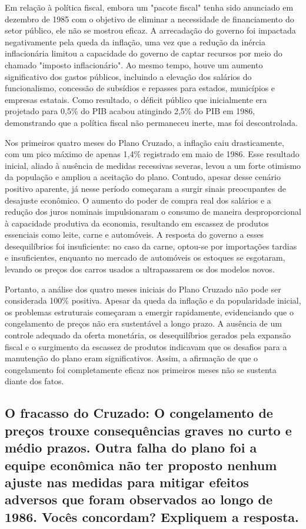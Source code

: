 \documentclass[a4paper,12pt]{article}[abntex2]
\begin{document}
Em relação à política fiscal, embora um "pacote fiscal" tenha sido anunciado em dezembro de 1985 com o objetivo de eliminar a necessidade de financiamento do setor público, ele não se mostrou eficaz. A arrecadação do governo foi impactada negativamente pela queda da inflação, uma vez que a redução da inércia inflacionária limitou a capacidade do governo de captar recursos por meio do chamado "imposto inflacionário". Ao mesmo tempo, houve um aumento significativo dos gastos públicos, incluindo a elevação dos salários do funcionalismo, concessão de subsídios e repasses para estados, municípios e empresas estatais. Como resultado, o déficit público que inicialmente era projetado para 0,5\% do PIB acabou atingindo 2,5\% do PIB em 1986, demonstrando que a política fiscal não permaneceu inerte, mas foi descontrolada.

Nos primeiros quatro meses do Plano Cruzado, a inflação caiu drasticamente, com um pico máximo de apenas 1,4\% registrado em maio de 1986. Esse resultado inicial, aliado à ausência de medidas recessivas severas, levou a um forte otimismo da população e ampliou a aceitação do plano. Contudo, apesar desse cenário positivo aparente, já nesse período começaram a surgir sinais preocupantes de desajuste econômico. O aumento do poder de compra real dos salários e a redução dos juros nominais impulsionaram o consumo de maneira desproporcional à capacidade produtiva da economia, resultando em escassez de produtos essenciais como leite, carne e automóveis. A resposta do governo a esses desequilíbrios foi insuficiente: no caso da carne, optou-se por importações tardias e insuficientes, enquanto no mercado de automóveis os estoques se esgotaram, levando os preços dos carros usados a ultrapassarem os dos modelos novos.

Portanto, a análise dos quatro meses iniciais do Plano Cruzado não pode ser considerada 100\% positiva. Apesar da queda da inflação e da popularidade inicial, os problemas estruturais começaram a emergir rapidamente, evidenciando que o congelamento de preços não era sustentável a longo prazo. A ausência de um controle adequado da oferta monetária, os desequilíbrios gerados pela expansão fiscal e o surgimento da escassez de produtos indicavam que os desafios para a manutenção do plano eram significativos. Assim, a afirmação de que o congelamento foi completamente eficaz nos primeiros meses não se sustenta diante dos fatos.

\subsection{\textbf{O fracasso do Cruzado: O congelamento de preços trouxe consequências graves no curto e médio prazos. Outra falha do plano foi a equipe econômica não ter proposto nenhum ajuste nas medidas para mitigar efeitos adversos que foram observados ao longo de 1986. Vocês concordam? Expliquem a resposta.}}
\end{document}
